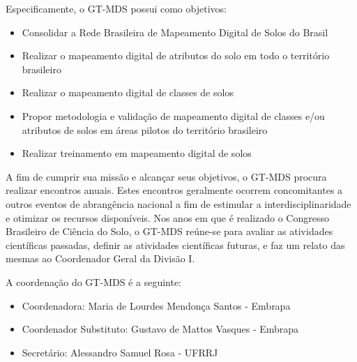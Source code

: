 Especificamente, o GT-MDS possui como objetivos:

\begin{itemize}
 \item Consolidar a Rede Brasileira de Mapeamento Digital de Solos do Brasil
 \item Realizar o mapeamento digital de atributos do solo em todo o território brasileiro
 \item Realizar o mapeamento digital de classes de solos
 \item Propor metodologia e validação de mapeamento digital de classes e/ou atributos de solos em áreas pilotos do território brasileiro
 \item Realizar treinamento em mapeamento digital de solos
\end{itemize}

A fim de cumprir sua missão e alcançar seus objetivos, o GT-MDS procura realizar encontros anuais. Estes encontros geralmente ocorrem concomitantes a outros eventos de abrangência nacional a fim de estimular a interdisciplinaridade e otimizar os recursos disponíveis. Nos anos em que é realizado o Congresso Brasileiro de Ciência do Solo, o GT-MDS reúne-se para avaliar as atividades científicas passadas, definir as atividades científicas futuras, e faz um relato das mesmas ao Coordenador Geral da Divisão I.

A coordenação do GT-MDS é a seguinte:

\begin{itemize}
 \item Coordenadora: Maria de Lourdes Mendonça Santos - Embrapa
 \item Coordenador Substituto: Gustavo de Mattos Vasques - Embrapa
 \item Secretário: Alessandro Samuel Rosa - UFRRJ
\end{itemize}

